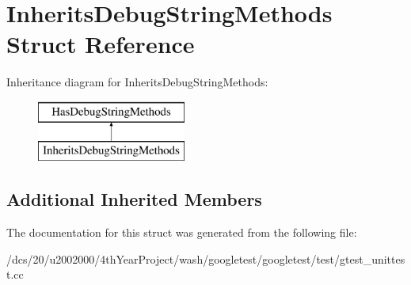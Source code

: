 \hypertarget{structInheritsDebugStringMethods}{}\section{Inherits\+Debug\+String\+Methods Struct Reference}
\label{structInheritsDebugStringMethods}
Inheritance diagram for Inherits\+Debug\+String\+Methods\+:\begin{figure}[H]
\begin{center}
\leavevmode
\includegraphics[height=2.000000cm]{structInheritsDebugStringMethods}
\end{center}
\end{figure}
\subsection*{Additional Inherited Members}


The documentation for this struct was generated from the following file\+:\begin{DoxyCompactItemize}
\item 
/dcs/20/u2002000/4th\+Year\+Project/wash/googletest/googletest/test/gtest\+\_\+unittest.\+cc\end{DoxyCompactItemize}
